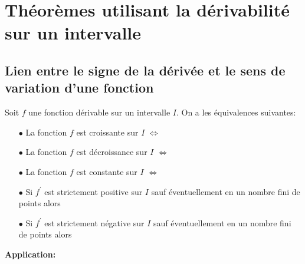 \documentclass[a4paper, 11pt]{article}
\begin{document}
\vspace*{0.5cm}


\section{Th\'eor\`{e}mes utilisant la d\'erivabilit\'e sur un intervalle}


\subsection{Lien entre le signe de la d\'eriv\'ee et le sens de variation d'une fonction}

{\noindent

	\begin{theorem}
		Soit $f$ une fonction d\'erivable sur un intervalle $I$. On a les \'equivalences suivantes:\vsec
		\begin{itemize}
			\item[$\bullet$] La fonction $f$ est croissante sur $I$ \; $\Longleftrightarrow $ \; \dotfill\vsec
			\item[$\bullet$] La fonction $f$ est d\'ecroissance sur $I$  \; $\Longleftrightarrow $ \;  \dotfill\vsec
			\item[$\bullet$] La fonction $f$ est constante sur $I$  \; $\Longleftrightarrow $ \;  \dotfill \vsec
			\item[$\bullet$] Si $f^{\prime}$ est strictement positive sur $I$ sauf \'eventuellement en un nombre fini de points alors \vsec\\
			      \hspace*{0cm}\dotfill \vsec
			\item[$\bullet$] Si $f^{\prime}$ est strictement n\'egative sur $I$ sauf \'eventuellement en un nombre fini de points alors \vsec\\
			      \hspace*{0cm}\dotfill \vsec
		\end{itemize}
	\end{theorem}
}\vsec

\noindent \textbf{Application:} \dotfill
\end{document}
